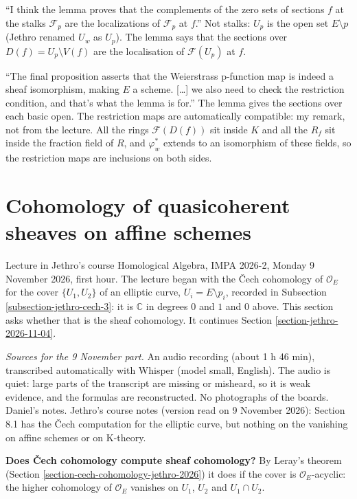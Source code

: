``I think the lemma proves that the
complements of the zero sets of sections $f$
at the stalks $\mathcal{F}_p$ are the
localizations of $\mathcal{F}_p$ at $f$.''
Not stalks: $U_p$ is the open set $E\setminus
p$ (Jethro renamed $U_w$ as $U_p$). The lemma
says that the sections over
$D(f)=U_p\setminus V(f)$ are the localisation
of $\mathcal{F}(U_p)$ at $f$.

``The final proposition asserts that the
Weierstrass p-function map is indeed a sheaf
isomorphism, making $E$ a scheme. [\ldots] we
also need to check the restriction condition,
and that's what the lemma is for.'' The lemma
gives the sections over each basic open. The
restriction maps are automatically
compatible: my remark, not from the lecture.
All the rings $\mathcal{F}(D(f))$ sit inside
$K$ and all the $R_f$ sit inside the fraction
field of $R$, and $\varphi_w^*$ extends to an
isomorphism of these fields, so the
restriction maps are inclusions on both
sides.

\section{Cohomology of quasicoherent
sheaves on affine schemes}
\label{section-jethro-2026-11-09}

Lecture in Jethro's course Homological
Algebra, IMPA 2026-2, Monday 9 November
2026, first hour. The lecture began with the
\v{C}ech cohomology of $\mathcal{O}_E$ for
the cover $\{U_1,U_2\}$ of an elliptic curve,
$U_i=E\setminus p_i$, recorded in Subsection
\ref{subsection-jethro-cech-3}: it is
$\mathbb{C}$ in degrees $0$ and $1$ and $0$
above. This section asks whether that is the
sheaf cohomology. It continues Section
\ref{section-jethro-2026-11-04}.

\textit{Sources for the 9 November part.} An
audio recording (about 1 h 46 min),
transcribed automatically with Whisper
(model small, English). The audio is quiet:
large parts of the transcript are missing or
misheard, so it is weak evidence, and the
formulas are reconstructed. No photographs
of the boards. Daniel's notes. Jethro's
course notes
\cite{vanEkerenHomologicalAlgebra2026}
(version read on 9 November 2026): Section
8.1 has the \v{C}ech computation for the
elliptic curve, but nothing on the
vanishing on affine schemes or on
K-theory.

\medskip\noindent
{\bf Does \v{C}ech cohomology compute sheaf
cohomology?} By Leray's theorem (Section
\ref{section-cech-cohomology-jethro-2026})
it does if the cover is
$\mathcal{O}_E$-acyclic: the higher
cohomology of $\mathcal{O}_E$ vanishes on
$U_1$, $U_2$ and $U_1\cap U_2$.

